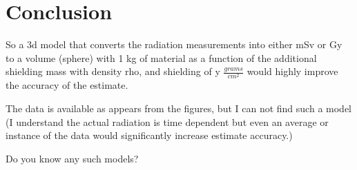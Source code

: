 \section{Conclusion}\label{sec:conclusion}
So a 3d model that converts the radiation measurements into either mSv or Gy to a volume (sphere) with 1 kg of material as a function of the additional shielding mass with density rho, and shielding of y $\frac{grams}{cm^2}$ would highly improve the accuracy of the estimate. 

\noindent The data is available as appears from the figures, but I can not find such a model (I understand the actual radiation is time dependent but even an average or instance of the data would significantly increase estimate accuracy.)

\noindent Do you know any such models?
